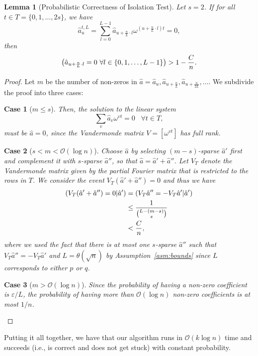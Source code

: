 \documentclass[11pt]{article}
\let\Pr\relax
\DeclareMathOperator*{\Pr}{\mathbb{P}}
\newcommand{\eps}{\varepsilon}
\theoremstyle{case}
\newtheorem{case}{Case}
\newcommand{\Bigo}{\mathcal{O}}
\newtheorem{lemma}[theorem]{Lemma}
\begin{document}
\begin{lemma}[Probabilistic Correctness of Isolation Test]
Let $s = 2$. If for all $t \in T = \{0,1,\ldots, 2s\}$, we have
$$
\hat{a}^{t,L}_u = \sum_{l = 0}^{L - 1} \hat{a}_{u + \frac{n}{L} \cdot l} \omega^{\left(u + \frac{n}{L} \cdot l\right) t} = 0,
$$
then
$$
\Pr\left(\hat{a}_{u + \frac{n}{L} \cdot l} = 0 \,\, \forall{l \in \{0, 1, \ldots, L -1\}}\right) > 1 - \frac{C}{n}.
$$
\end{lemma}
\begin{proof}
Let $m$ be the number of non-zeros in $\hat{a} = \hat{a}_u, \hat{a}_{u + \frac{n}{L}},\hat{a}_{u + \frac{n}{2L}},\ldots$. We subdivide the proof into three cases:
\begin{case}[$m \leq s$]
Then, the solution to the linear system
$$
\sum_{v} \hat{a}_v \omega^{vt} = 0 \,\,\,\,\, \forall{t \in T},
$$
must be $\hat{a} = 0$, since the Vandermonde matrix $V = [\omega^{vt}]$ has full rank.
\end{case}
\begin{case}[$s < m < \Bigo(\log n)$]
Choose $\hat{a}$ by selecting $(m-s)$-sparse $\hat{a}'$ first and complement it with $s$-sparse $\hat{a}''$, so that $\hat{a} = \hat{a}' + \hat{a}''$. Let $V_T$ denote the Vandermonde matrix given by the partial Fourier matrix that is restricted to the rows in $T$. We consider the event $V_T(\hat{a}' + \hat{a}'') = 0$ and thus we have
\begin{align*}
\Pr(V_T(\hat{a}' + \hat{a}'') = 0|\hat{a}'
) &= \Pr(V_T \hat{a}'' = - V_T \hat{a}' | \hat{a}') \\
&\leq \frac{1}{ \binom{L - (m-s)}{s}} \\
&< \frac{C}{n},
\end{align*}
where we used the fact that there is at most one $s$-sparse $\hat{a}''$ such that $V_T \hat{a}'' = -V_T \hat{a}'$ and $L = \theta(\sqrt{n})$ by Assumption~\ref{asm:bounds} since $L$ corresponds to either $p$ or $q$.
\end{case}
\begin{case}[$m > \Bigo(\log n)$]
Since the probability of having a non-zero coefficient is $\eps/L$, the probability of having more than $\Bigo(\log n)$ non-zero coefficients is at most $1/n$. 
\end{case}
\end{proof}

Putting it all together, we have that our algorithm runs in $\Bigo(k \log n)$ time and succeeds (i.e., is correct and does not get stuck) with constant probability.
\end{document}
